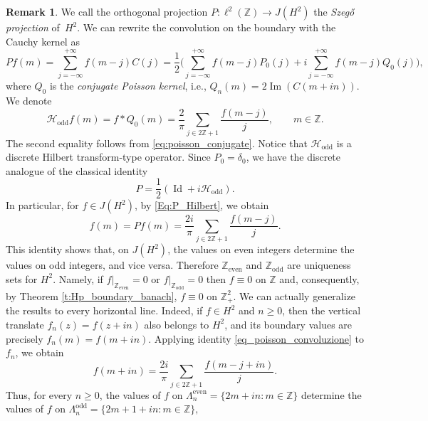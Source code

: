 \documentclass[12pt,a4paper,reqno]{amsart}
\theoremstyle{definition}
\newtheorem{rmk}[thm]{Remark}
\theoremstyle{definition}\newtheorem{defn}[thm]{Definition}
\begin{document}
    \begin{rmk}  
    We call the orthogonal projection \(
    P:\ell^2(\mathbb Z)\to J(H^2)
    \) the \emph{Szeg\H o projection} of~$H^2$. We can rewrite the convolution on the boundary with the Cauchy kernel as
    \[
    Pf(m)
    =
    \sum_{j=-\infty}^{+\infty}f(m-j)C(j)=\frac{1}{2}\Big(\sum_{j=-\infty}^{+\infty}f(m-j)P_0(j)+i\sum_{j=-\infty}^{+\infty}f(m-j)Q_0(j)\Big),
    \]
    where $Q_0$ is the \emph{conjugate Poisson kernel}, i.e., $Q_n(m)=2\operatorname{Im}(C(m+in))$. We denote
    \[
    \mathcal H_{\operatorname{odd}}f(m)=f\ast Q_0(m)=\frac{2}{\pi}
    \sum_{j\in 2\mathbb Z+1}
    \frac{f(m-j)}{j}, \qquad m\in\mathbb Z.
    \]
    The second equality follows from \eqref{eq:poisson_conjugate}. Notice that $\mathcal H_{\operatorname{odd}}$  is a discrete Hilbert transform-type operator.
    Since $P_0=\delta_0$, we have the discrete analogue of the classical identity
    \begin{equation}\label{Eq:P_Hilbert}    
    P=\frac{1}{2}(\operatorname{ Id}+i\mathcal H_{\operatorname{odd}}).
    \end{equation}
        In particular, for $f\in J(H^2)$, by \eqref{Eq:P_Hilbert}, we obtain
    \begin{equation}\label{eq_poisson_convoluzione}
    f(m)=Pf(m)=\frac{2i}{\pi}\sum_{j\in2\mathbb Z+1}\frac{f(m-j)}{j}.
    \end{equation}
    This identity shows that, on $J(H^2)$, the values on even integers determine the values on odd integers, and vice versa. Therefore $\mathbb Z_{\mathrm{even}}$ and $\mathbb Z_{\mathrm{odd}}$ are uniqueness sets for $H^2$. Namely, if
    $f|_{\mathbb Z_{\operatorname{even}}}=0$ or 
    $f|_{\mathbb Z_{\operatorname{odd}}}=0$
    then $f\equiv 0$ on $\mathbb Z$ and, consequently, by Theorem \ref{t:Hp_boundary_banach}, $f\equiv 0$ on $\mathbb Z^2_+$. We can actually generalize the results to every horizontal line. Indeed, if $f\in H^2$
    and $n\geqslant 0$, then the vertical translate
    $
    f_n(z)=f(z+in)
    $
    also belongs to $H^2$, and its boundary values are precisely
    $f_n(m)=f(m+in)$. Applying identity \eqref{eq_poisson_convoluzione} to $f_n$, we obtain
    \begin{equation}\label{eq:f_even_odd}
    f(m+in)
    =
    \frac{2i}{\pi}
    \sum_{j\in2\mathbb Z+1}
    \frac{f(m-j+in)}{j}.
    \end{equation}
    Thus, for every $n\geqslant0$, the values of $f$ on $ \Lambda^{\operatorname{even}}_n=\{2m+in:m\in\mathbb Z\}$ determine the values of $f$ on $\Lambda^{\operatorname{odd}}_n=\{2m+1+in:m\in\mathbb Z\},$

\end{rmk}
\end{document}
